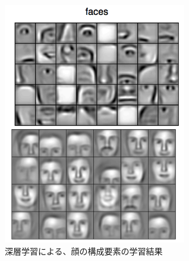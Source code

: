 \begin{figure}[tbp]
 \centering
  \includegraphics[width=80mm]{img/c1/lee2009_faces}
 \caption{深層学習による、顔の構成要素の学習結果}
 \label{c1_lee2009_faces}
\end{figure}
\par

